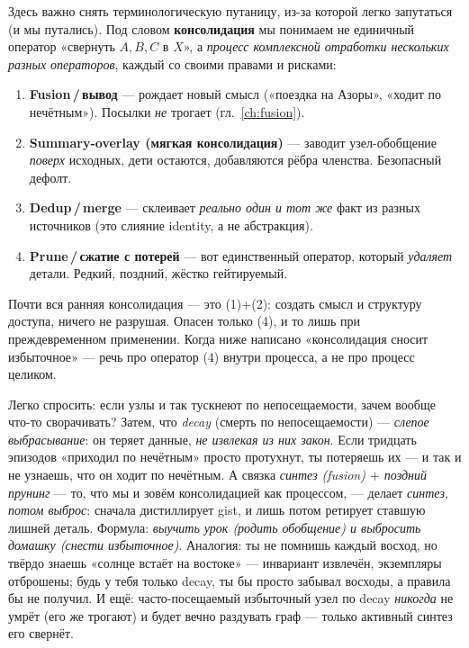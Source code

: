 \begin{principle}
Здесь важно снять терминологическую путаницу, из-за которой легко запутаться (и мы
путались). Под словом \textbf{консолидация} мы понимаем не единичный оператор
«свернуть $A,B,C$ в $X$», а \emph{процесс комплексной отработки нескольких разных
операторов}, каждый со своими правами и рисками:
\begin{enumerate}\itemsep2pt
\item \textbf{Fusion\,/\,вывод} — рождает новый смысл («поездка на Азоры», «ходит по
нечётным»). Посылки \emph{не} трогает (гл.~\ref{ch:fusion}).
\item \textbf{Summary-overlay (мягкая консолидация)} — заводит узел-обобщение
\emph{поверх} исходных, дети остаются, добавляются рёбра членства. Безопасный дефолт.
\item \textbf{Dedup\,/\,merge} — склеивает \emph{реально один и тот же} факт из разных
источников (это слияние identity, а не абстракция).
\item \textbf{Prune\,/\,сжатие с потерей} — вот единственный оператор, который
\emph{удаляет} детали. Редкий, поздний, жёстко гейтируемый.
\end{enumerate}
Почти вся ранняя консолидация — это (1)+(2): создать смысл и структуру доступа, ничего
не разрушая. Опасен только (4), и то лишь при преждевременном применении. Когда ниже
написано «консолидация сносит избыточное» — речь про оператор (4) внутри процесса, а не
про процесс целиком.
\end{principle}

\begin{intuition}
Легко спросить: если узлы и так тускнеют по непосещаемости, зачем вообще что-то
сворачивать? Затем, что \emph{decay} (смерть по непосещаемости) — \emph{слепое
выбрасывание}: он теряет данные, \emph{не извлекая из них закон}. Если тридцать
эпизодов «приходил по нечётным» просто протухнут, ты потеряешь их — и так и не узнаешь,
что он ходит по нечётным. А связка \emph{синтез (fusion) $+$ поздний прунинг} — то, что
мы и зовём консолидацией как процессом, — делает \emph{синтез, потом выброс}: сначала
дистиллирует gist, и лишь потом ретирует ставшую лишней деталь. Формула: \emph{выучить
урок (родить обобщение) и выбросить домашку (снести избыточное)}. Аналогия: ты не
помнишь каждый восход, но твёрдо знаешь «солнце встаёт на востоке» — инвариант извлечён,
экземпляры отброшены; будь у тебя только decay, ты бы просто забывал восходы, а правила
бы не получил. И ещё: часто-посещаемый избыточный узел по decay \emph{никогда} не умрёт
(его же трогают) и будет вечно раздувать граф — только активный синтез его свернёт.
\end{intuition}

